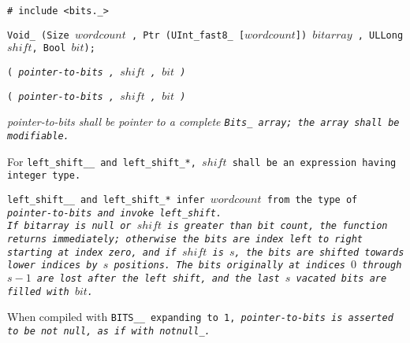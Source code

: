 
\tt{# include <bits._>}

\tt{Void_}  \tt{(Size} $wordcount$%
\tt{, Ptr (UInt_fast8_ [}$wordcount$\tt{])} $bitarray$%
\tt{, ULLong} $shift$\tt{, Bool} $bit$\tt{);}

\s\tt{(}
\it{pointer-to-bits} \tt{,} $shift$ \tt{,} $bit$ \tt{)}

\s\s\tt{(}
\it{pointer-to-bits} \tt{,} $shift$ \tt{,} $bit$ \tt{)}


\it{pointer-to-bits} shall be pointer to a complete
\tt{Bits_} array; the array shall be modifiable.

For \tt{left_shift__} and \tt{left_shift_}*,
$shift$ shall be an expression having integer type.


\tt{left_shift__} and \tt{left_shift_}* infer $wordcount$ from
the type of \it{pointer-to-bits} and invoke \tt{left_shift}.\\
If \it{bitarray} is null or $shift$ is greater than bit count,
the function returns immediately; otherwise the bits are index
left to right starting at index zero, and if $shift$ is $s$,
the bits are shifted towards lower indices by $s$ positions.
The bits originally at indices $0$ through $s - 1$ are lost after
the left shift, and the last $s$ vacated bits are filled with $bit$.

When compiled with \tt{BITS__} expanding to \tt{1},
\it{pointer-to-bits} is asserted to be not null, as if with \tt{notnull_}.

